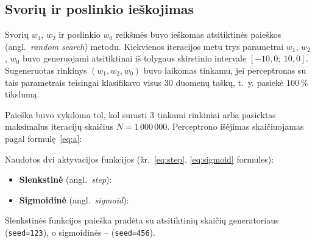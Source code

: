 \subsection{Svorių ir poslinkio ieškojimas}
\label{subsec:ieskojimas}

Svorių $w_1$, $w_2$ ir poslinkio $w_0$ reikšmės buvo ieškomas atsitiktinės paieškos (angl.~\textit{random search}) metodu. Kiekvienos iteracijos metu trys parametrai $w_1$, $w_2$, $w_0$ buvo generuojami atsitiktinai iš tolygaus skirstinio intervale $[-10{,}0;\ 10{,}0]$. Sugeneruotas rinkinys $(w_1, w_2, w_0)$ buvo laikomas tinkamu, jei perceptronas su tais parametrais teisingai klasifikavo visus 30 duomenų taškų, t.~y. pasiekė $100\ \%$ tikslumą.

Paieška buvo vykdoma tol, kol surasti 3 tinkami rinkiniai arba pasiektas maksimalus iteracijų skaičius $N = 1\,000\,000$. Perceptrono išėjimas skaičiuojamas pagal formulę~\eqref{eq:a}:


Naudotos dvi aktyvacijos funkcijos (žr.~\ref{eq:step}, \ref{eq:sigmoid} formules):
\begin{itemize}
    \item \textbf{Slenkstinė} (angl.~\textit{step}):
        
    \item \textbf{Sigmoidinė} (angl.~\textit{sigmoid}):
        
\end{itemize}

Slenkstinės funkcijos paieška pradėta su atsitiktinių skaičių generatoriaus (\texttt{seed=123}), o sigmoidinės – (\texttt{seed=456}).